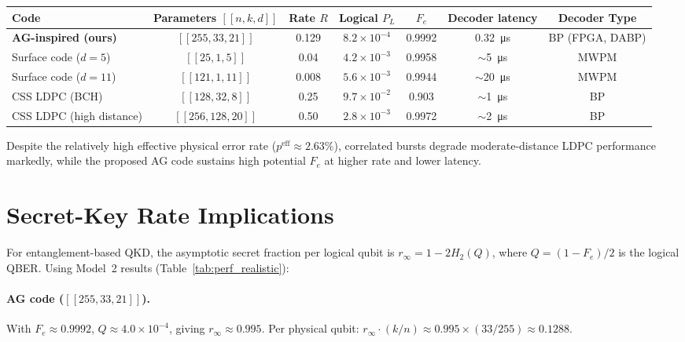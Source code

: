 \begin{table*}[t]
\centering
\caption{Performance under Model 2 (asymmetric, correlated; effective \(p^{\mathrm{eff}}\approx2.63\times10^{-2}\)). Fidelity estimates (PL, Fe) assume idealized decoding (BDD/MWPM); latency refers to the proposed hardware implementation.}
\label{tab:perf_realistic}
\begin{tabular}{lcccccc}
\toprule
\textbf{Code} & \textbf{Parameters $[[n,k,d]]$} & \textbf{Rate $R$} & \textbf{Logical $P_L$} & \textbf{$F_e$} & \textbf{Decoder latency} & \textbf{Decoder Type} \\
\midrule
\textbf{AG-inspired (ours)} & $[[255,33,21]]$ & 0.129 & \(8.2\times 10^{-4}\) & 0.9992 & \SI{0.32}{\micro\second} & BP (FPGA, DABP) \\
Surface code ($d=5$) & $[[25,1,5]]$ & 0.04 & \(4.2\times 10^{-3}\) & 0.9958 & \(\sim\)\SI{5}{\micro\second} & MWPM \\
Surface code ($d=11$) & $[[121,1,11]]$ & 0.008 & \(5.6\times 10^{-3}\) & 0.9944 & \(\sim\)\SI{20}{\micro\second} & MWPM \\
CSS LDPC (BCH) & $[[128,32,8]]$ & 0.25 & \(9.7\times 10^{-2}\) & 0.903 & \(\sim\)\SI{1}{\micro\second} & BP \\
CSS LDPC (high distance) & $[[256,128,20]]$ & 0.50 & \(2.8\times 10^{-3}\) & 0.9972 & \(\sim\)\SI{2}{\micro\second} & BP \\
\bottomrule
\end{tabular}
\end{table*}

Despite the relatively high effective physical error rate (\(p^{\mathrm{eff}}\approx2.63\%\)), correlated bursts degrade moderate-distance LDPC performance markedly, while the proposed AG code sustains high potential \(F_e\) at higher rate and lower latency.

\section{Secret-Key Rate Implications}\label{sec:finitekey}
For entanglement-based QKD, the asymptotic secret fraction per logical qubit is \(r_\infty=1-2H_2(Q)\), where \(Q=(1-F_e)/2\) is the logical QBER. Using Model~2 results (Table~\ref{tab:perf_realistic}):

\paragraph*{AG code (\( [[255,33,21]] \)).}
With \(F_e\approx0.9992\), \(Q\approx4.0\times10^{-4}\), giving \(r_\infty\approx0.995\). Per physical qubit: \(r_\infty\cdot (k/n)\approx 0.995\times(33/255)\approx 0.1288\).


